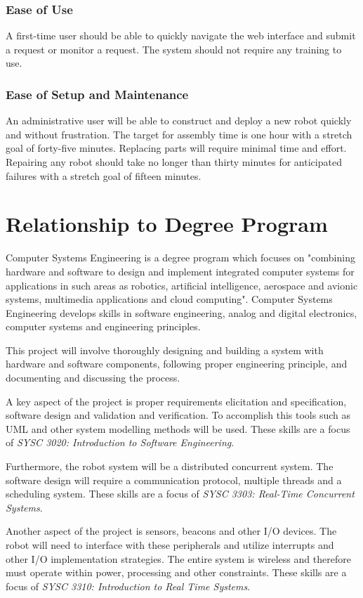 \documentclass[12pt]{report}
\begin{document}
\subsubsection{Ease of Use}
A first-time user should be able to quickly navigate the web interface and submit a request or monitor a request. The system should not require any training to use.

\subsubsection{Ease of Setup and Maintenance}
An administrative user will be able to construct and deploy a new robot quickly and without frustration. The target for assembly time is one hour with a stretch goal of forty-five minutes. Replacing parts will require minimal time and effort. Repairing any robot should take no longer than thirty minutes for anticipated failures with a stretch goal of fifteen minutes.

\section{Relationship to Degree Program}
Computer Systems Engineering is a degree program which focuses on "combining hardware and software to design and implement integrated computer systems for applications in such areas as robotics, artificial intelligence, aerospace and avionic systems, multimedia applications and cloud computing". Computer Systems Engineering develops skills in software engineering, analog and digital electronics, computer systems and engineering principles.

This project will involve thoroughly designing and building a system with hardware and software components, following proper engineering principle, and documenting and discussing the process.

A key aspect of the project is proper requirements elicitation and specification, software design and validation and verification. To accomplish this tools such as UML and other system modelling methods will be used. These skills are a focus of \textit{SYSC 3020: Introduction to Software Engineering}.

Furthermore, the robot system will be a distributed concurrent system. The software design will require a communication protocol, multiple threads and a scheduling system. These skills are a focus of \textit{SYSC 3303: Real-Time Concurrent Systems}.

Another aspect of the project is sensors, beacons and other I/O devices. The robot will need to interface with these peripherals and utilize interrupts and other I/O implementation strategies. The entire system is wireless and therefore must operate within power, processing and other constraints. These skills are a focus of \textit{SYSC 3310: Introduction to Real Time Systems}.
\end{document}
